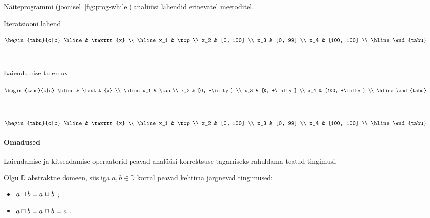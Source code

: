 \documentclass[../thesis.tex]{subfiles}
\begin{document}
\begin{table}
	\caption{Näiteprogrammi (joonisel~\ref{fig:prog-while}) analüüsi lahendid erinevatel meetoditel.}
	\centering
	\begin{subtable}[t]{0.3\textwidth}
		\caption{Iteratsiooni lahend}
		\centering
		$\begin{tabu}{c|c}
		\hline
		 & \texttt{x} \\
		\hline
		x_1 & \top \\
		x_2 & [0, 100] \\
		x_3 & [0, 99] \\
		x_4 & [100, 100] \\
		\hline
		\end{tabu}$
		\label{tab:while-iter}
	\end{subtable}
	~
	\begin{subtable}[t]{0.3\textwidth}
		\caption{Laiendamise tulemus}
		\centering
		$\begin{tabu}{c|c}
		\hline
		 & \texttt{x} \\
		\hline
		x_1 & \top \\
		x_2 & [0, +\infty] \\
		x_3 & [0, +\infty] \\
		x_4 & [100, +\infty] \\
		\hline
		\end{tabu}$
		\label{tab:while-widen}
	\end{subtable}
	~
	\begin{subtable}[t]{0.3\textwidth}
		\caption{Kitsendamise tulemus}
		\centering
		$\begin{tabu}{c|c}
		\hline
		 & \texttt{x} \\
		\hline
		x_1 & \top \\
		x_2 & [0, 100] \\
		x_3 & [0, 99] \\
		x_4 & [100, 100] \\
		\hline
		\end{tabu}$
		\label{tab:while-narrow}
	\end{subtable}
	\label{tab:itersolve-while}
\end{table}

\paragraph{Omadused}
Laiendamise ja kitsendamise operaatorid peavad analüüsi korrektsuse tagamiseks rahuldama teatud tingimusi.

\noindent
Olgu $\mathbb{D}$ abstraktne domeen, siis iga $a, b \in \mathbb{D}$ korral peavad kehtima järgnevad tingimused:
\begin{itemize}[nosep]
	\item $a \sqcup b \sqleq a \widen b$ \cite[61]{seidl_foundations};
	\item $a \sqcap b \sqleq a \narrow b \sqleq a$ \cite[66]{seidl_foundations}.
\end{itemize}
\end{document}
